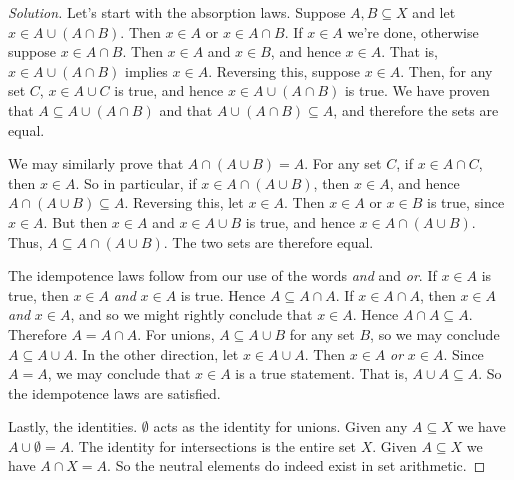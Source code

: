 \documentclass{article}
\theoremstyle{normal}
\begin{document}
    \begin{proof}[Solution]
        Let's start with the absorption laws. Suppose
        $A,B\subseteq{X}$ and let $x\in{A}\cup(A\cap{B})$. Then
        $x\in{A}$ or $x\in{A}\cap{B}$. If $x\in{A}$ we're done, otherwise
        suppose $x\in{A}\cap{B}$. Then $x\in{A}$ and $x\in{B}$, and hence
        $x\in{A}$. That is, $x\in{A}\cup(A\cap{B})$ implies $x\in{A}$.
        Reversing this, suppose $x\in{A}$. Then, for any set $C$,
        $x\in{A}\cup{C}$ is true, and hence
        $x\in{A}\cup(A\cap{B})$ is true. We have proven that
        $A\subseteq{A}\cup(A\cap{B})$ and that
        $A\cup(A\cap{B})\subseteq{A}$, and therefore the sets are equal.
        \par\hfill\par
        We may similarly prove that $A\cap(A\cup{B})=A$.
        For any set $C$, if $x\in{A}\cap{C}$, then $x\in{A}$. So in particular,
        if $x\in{A}\cap(A\cup{B})$, then $x\in{A}$, and hence
        $A\cap(A\cup{B})\subseteq{A}$. Reversing this, let $x\in{A}$.
        Then $x\in{A}$ or $x\in{B}$ is true, since $x\in{A}$. But then
        $x\in{A}$ and $x\in{A}\cup{B}$ is true, and hence
        $x\in{A}\cap(A\cup{B})$. Thus, $A\subseteq{A}\cap(A\cup{B})$. The two
        sets are therefore equal.
        \par\hfill\par
        The idempotence laws follow from our use of the words \textit{and} and
        \textit{or}. If $x\in{A}$ is true, then $x\in{A}$ \textit{and} $x\in{A}$
        is true. Hence $A\subseteq{A}\cap{A}$. If $x\in{A}\cap{A}$, then
        $x\in{A}$ \textit{and} $x\in{A}$, and so we might rightly conclude
        that $x\in{A}$. Hence $A\cap{A}\subseteq{A}$. Therefore
        $A=A\cap{A}$. For unions, $A\subseteq{A}\cup{B}$ for any set $B$,
        so we may conclude $A\subseteq{A}\cup{A}$. In the other direction,
        let $x\in{A}\cup{A}$. Then $x\in{A}$ \textit{or} $x\in{A}$. Since
        $A=A$, we may conclude that $x\in{A}$ is a true statement. That is,
        $A\cup{A}\subseteq{A}$. So the idempotence laws are satisfied.
        \par\hfill\par
        Lastly, the identities. $\emptyset$ acts as the identity for unions.
        Given any $A\subseteq{X}$ we have $A\cup\emptyset=A$. The identity for
        intersections is the entire set $X$. Given $A\subseteq{X}$ we have
        $A\cap{X}=A$. So the neutral elements do indeed exist in set arithmetic.
    \end{proof}
\end{document}
